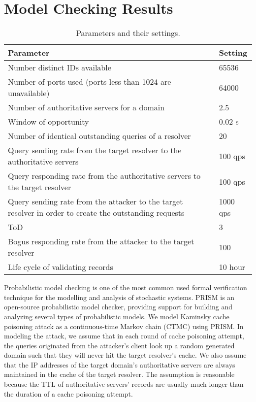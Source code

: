 \documentclass[conference]{IEEEtran}
\begin{document}
\section{Model Checking Results}

\begin{table}[!htb]
\centering
\caption{Parameters and their settings.}\label{tab:1}
\begin{tabular}{p{7.5cm}p{1cm}}
\toprule
Parameter & Setting\\
\midrule
Number distinct IDs available & 65536\\
Number of ports used (ports less than 1024 are unavailable) & 64000 \\
Number of authoritative servers for a domain & 2.5\\
Window of opportunity & 0.02 s\\
Number of identical outstanding queries of a resolver & 20\\
Query sending rate from the target resolver to the authoritative servers & 100 qps\\
Query responding rate from the authoritative servers to the target resolver & 100 qps\\
Query sending rate from the attacker to the target resolver in order to create the outstanding requests	& 1000 qps\\
ToD	& 3\\
Bogus responding rate from the attacker to the target resolver	& 100\\
Life cycle of validating records & 10 hour\\
\bottomrule
\end{tabular}
\end{table}

Probabilistic model checking is one of the most common used formal verification technique for the modelling and analysis of stochastic systems. 
PRISM \cite{PRISM} is an open-source probabilistic model checker, providing support for building and analyzing several types of probabilistic models.
We model Kaminsky cache poisoning attack as a continuous-time Markov chain (CTMC) using PRISM. In modeling the attack, we assume that in each round of cache poisoning attempt, the queries originated from the attacker's client look up a random generated domain such that they will never hit the target resolver's cache. 
We also assume that the IP addresses of the target domain's authoritative servers are always maintained in the cache of the target resolver. The assumption is reasonable because the TTL of authoritative servers' records are usually much longer than the duration of a cache poisoning attempt.
\end{document}

